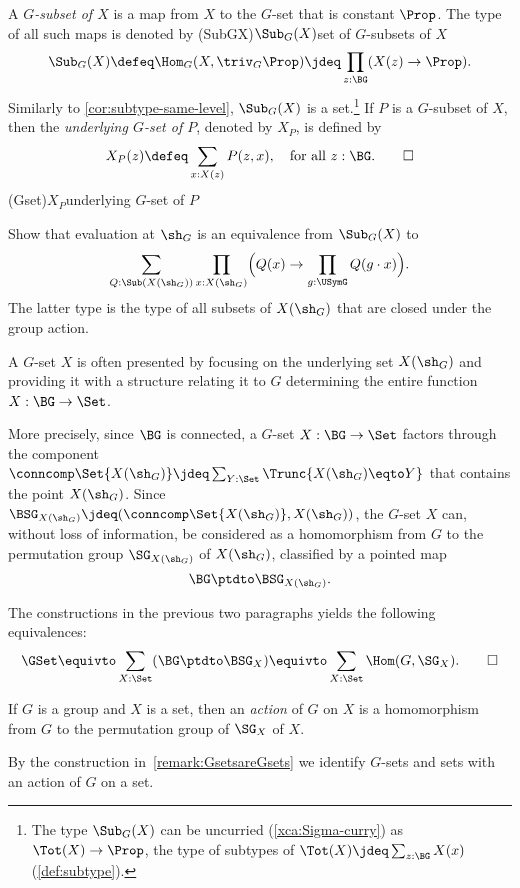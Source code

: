 \begin{definition}\label{def:Gsubset}
  A \emph{$G$-subset of $X$} is a map from $X$ to the $G$-set that is
  constant $\Prop$. The type of all such maps is denoted by%
  \glossary(SubGX){$\protect\Sub_G(X)$}{set of $G$-subsets of $X$}
  \[
   \Sub_G(X)\defeq \Hom_G(X,\triv_G\Prop) \jdeq \prod_{z:\BG}(X(z)\to\Prop).
  \]
  Similarly to \cref{cor:subtype-same-level}, $\Sub_{G}(X)$ is a set.\footnote{%
  \label{ft:SubTotX} The type $\Sub_{G}(X)$ can be uncurried 
  (\cref{xca:Sigma-curry}) as $\Tot(X)\to\Prop$, 
  the type of subtypes of $\Tot(X)\jdeq\sum_{z:\BG}X(x)$ (\cref{def:subtype}).}
  If $P$ is a $G$-subset of $X$, then the \emph{underlying $G$-set of $P$},
  denoted by $X_P$, is defined by
  \[
  X_P(z) \defeq \sum_{x:X(z)}{P(z,x)},\quad\text{for all $z:\BG$}.\qedhere
  \]
  \glossary(Gset){$X_P$}{underlying $G$-set of $P$}
\end{definition}

\begin{xca}\label{xca:SubGX-closedSubXshG}
Show that evaluation at $\sh_G$ is an equivalence from $\Sub_G(X)$ to
\[
  \sum_{Q:\Sub(X(\sh_G))}
  \prod_{x:X(\sh_G)}
  \Bigl(Q(x)\to\prod_{g:\USymG} Q(g\cdot x)\Bigr).
\]
The latter type is the type of all
subsets of $X(\sh_G)$ that are closed under the group action.
\end{xca}

\begin{remark}
  \label{remark:GsetsareGsets}
  A $G$-set $X$ is often presented by focusing on the underlying set $X(\sh_G)$
  and providing it with a structure relating it to $G$ determining
  the entire function $X : \BG\to\Set$.

  More precisely, since $\BG$ is connected, a $G$-set $X : \BG\to\Set$ factors
  through the component
  $\conncomp \Set {X(\sh_G)} \jdeq \sum_{Y:\Set}\Trunc{X(\sh_G) \eqto Y}$
  that contains the point $X(\sh_G)$.
  Since $\BSG_{X(\sh_G)}\jdeq(\conncomp \Set {X(\sh_G)},X(\sh_G))$,
  the $G$-set $X$ can,
  without loss of information, be considered as a homomorphism from $G$ to
  the permutation group $\SG_{X(\sh_G)}$ of $X(\sh_G)$,
  classified by a pointed map
  \[
    \BG\ptdto\BSG_{X(\sh_G)}.
  \]

  The constructions in the previous two paragraphs yields the following equivalences:
  \[
    \GSet \equivto \sum_{X:\Set} (\BG \ptdto \BSG_X)
     \equivto \sum_{X:\Set}\Hom(G,\SG_X).\qedhere
   \]
\end{remark}

\begin{definition}\label{def:Gaction}
  If $G$ is a group and $X$ is a set, then an \emph{action}
  of $G$ on $X$
  is a homomorphism from $G$ to the permutation group of $\SG_X$ of $X$.%
\end{definition}
By the construction in~\cref{remark:GsetsareGsets} we identify $G$-sets
and sets with an action of $G$ on a set.


